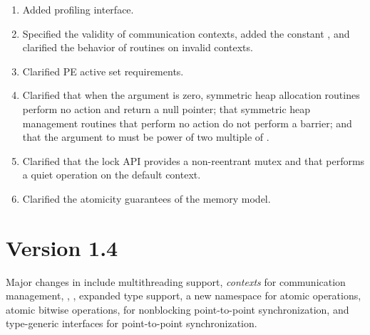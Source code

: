 \begin{enumerate}
  .
%
%
\item Added \openshmem profiling interface.
%
%
\item Specified the validity of communication contexts, added the constant
  , and clarified the behavior of
   routines on invalid contexts.
%
%
\item Clarified \ac{PE} active set requirements.
%
%
\item Clarified that when the  argument is zero, symmetric heap
    allocation routines perform no action and return a null pointer; that
    symmetric heap management routines that perform no action do not perform a
    barrier; and that the  argument to  must
    be power of two multiple of .
%
%
\item Clarified that the \openshmem lock \ac{API} provides a non-reentrant mutex and
    that  performs a quiet operation on the default
    context.
%
%
\item Clarified the atomicity guarantees of the \openshmem memory model.
%
%
\end{enumerate}

\section{Version 1.4}
Major changes in \openshmem[1.4] include
multithreading support,
\emph{contexts} for communication management,
,
,
expanded type support,
a new namespace for atomic operations,
atomic bitwise operations,
 for nonblocking point-to-point synchronization,
and \Cstd[11] type-generic interfaces for point-to-point synchronization.

